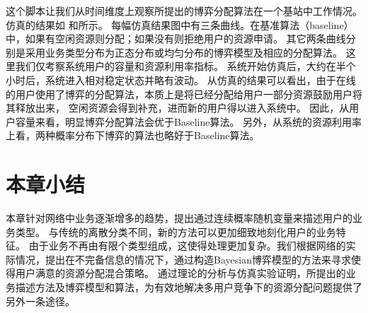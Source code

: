 这个脚本让我们从时间维度上观察所提出的博弈分配算法在一个基站中工作情况。
仿真的结果如  和所示。
每幅仿真结果图中有三条曲线。在基准算法（baseline）中，如果有空闲资源则分配；如果没有则拒绝用户的资源申请。
其它两条曲线分别是采用业务类型分布为正态分布或均匀分布的博弈模型及相应的分配算法。
这里我们仅考察系统用户的容量和资源利用率指标。
系统开始仿真后，大约在半个小时后，系统进入相对稳定状态并略有波动。
从仿真的结果可以看出，由于在线的用户使用了博弈的分配算法，本质上是将已经分配给用户一部分资源鼓励用户将其释放出来，
空闲资源会得到补充，进而新的用户得以进入系统中。
因此，从用户容量来看，明显博弈分配算法会优于Baseline算法。
另外，从系统的资源利用率上看，两种概率分布下博弈的算法也略好于Baseline算法。
\section{本章小结}
本章针对网络中业务逐渐增多的趋势，提出通过连续概率随机变量来描述用户的业务类型。
与传统的离散分类不同，新的方法可以更加细致地刻化用户的业务特征。
由于业务不再由有限个类型组成，这使得处理更加复杂。我们根据网络的实际情况，提出在不完备信息的情况下，通过构造Bayesian博弈模型的方法来寻求使得用户满意的资源分配混合策略。
通过理论的分析与仿真实验证明，所提出的业务描述方法及博弈模型和算法，为有效地解决多用户竞争下的资源分配问题提供了另外一条途径。


